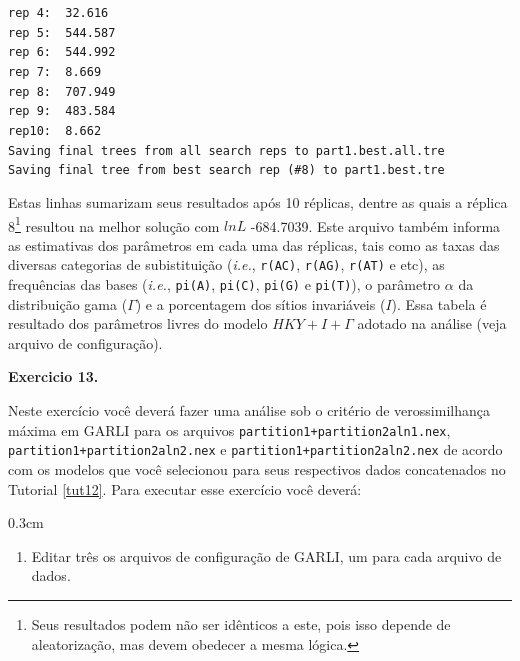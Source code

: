 \begin{refsection}
\texttt{rep~4:~~32.616}\\
\texttt{rep~5:~~544.587}\\
\texttt{rep~6:~~544.992}\\
\texttt{rep~7:~~8.669}\\
\texttt{rep~8:~~707.949}\\
\texttt{rep~9:~~483.584}\\
\texttt{rep10:~~8.662}\\
\texttt{Saving~final~trees~from~all~search~reps~to~part1.best.all.tre}\\
\texttt{Saving~final~tree~from~best~search~rep~(\#8)~to~part1.best.tre}\\
\normalsize

Estas linhas sumarizam seus resultados após 10 réplicas, dentre as quais a réplica 8\footnote{ Seus resultados podem não ser idênticos a este, pois isso depende de aleatorização, mas devem obedecer a mesma lógica.} resultou na melhor solução com $lnL$ -684.7039. Este arquivo também informa as estimativas dos parâmetros em cada uma das réplicas, tais como as taxas das diversas categorias de subistituição (\textit{i.e.}, \texttt{r(AC)}, \texttt{r(AG)}, \texttt{r(AT)} e etc), as frequências das bases (\textit{i.e.}, \texttt{pi(A)}, \texttt{pi(C)}, \texttt{pi(G)} e \texttt{pi(T)}), o parâmetro $\alpha$ da distribuição gama ($\Gamma$) e a porcentagem dos sítios invariáveis ($I$). Essa tabela é resultado dos parâmetros livres do modelo $HKY+I+\Gamma$ adotado na análise (veja arquivo de configuração).\\


\begin{blackBlock}{\textbf{Exercicio 13.}}\label{tut13:ex:13.2}

Neste exercício você deverá fazer uma análise sob o critério de verossimilhança máxima em GARLI para os arquivos \texttt{partition1+partition2aln1.nex}, \texttt{partition1+partition2aln2.nex} e \texttt{partition1+partition2aln2.nex} de acordo com os modelos que você selecionou para seus respectivos dados concatenados no Tutorial \ref{tut12}. Para executar esse exercício você deverá:

\end{blackBlock}


\begin {myindentpar}{0.3cm}
\begin{enumerate}[\itshape 1.]

    \item{Editar três os arquivos de configuração de GARLI, um para cada arquivo de dados.}


\end{enumerate}
\end{myindentpar}
\end{refsection}
